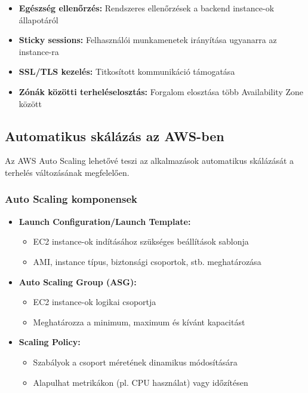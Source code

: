 \documentclass[a4paper,12pt]{article}
\begin{document}
    \begin{itemize}
        \item \textbf{Egészség ellenőrzés:} Rendszeres ellenőrzések a backend instance-ok állapotáról
        \item \textbf{Sticky sessions:} Felhasználói munkamenetek irányítása ugyanarra az instance-ra
        \item \textbf{SSL/TLS kezelés:} Titkosított kommunikáció támogatása
        \item \textbf{Zónák közötti terheléselosztás:} Forgalom elosztása több Availability Zone között
    \end{itemize}

    \subsection{Automatikus skálázás az AWS-ben}

    Az AWS Auto Scaling lehetővé teszi az alkalmazások automatikus skálázását a terhelés változásának megfelelően.

    \subsubsection{Auto Scaling komponensek}

    \begin{itemize}
        \item \textbf{Launch Configuration/Launch Template:}
        \begin{itemize}
            \item EC2 instance-ok indításához szükséges beállítások sablonja
            \item AMI, instance típus, biztonsági csoportok, stb. meghatározása
        \end{itemize}

        \item \textbf{Auto Scaling Group (ASG):}
        \begin{itemize}
            \item EC2 instance-ok logikai csoportja
            \item Meghatározza a minimum, maximum és kívánt kapacitást
        \end{itemize}

        \item \textbf{Scaling Policy:}
        \begin{itemize}
            \item Szabályok a csoport méretének dinamikus módosítására
            \item Alapulhat metrikákon (pl. CPU használat) vagy időzítésen
        \end{itemize}
    \end{itemize}
\end{document}
